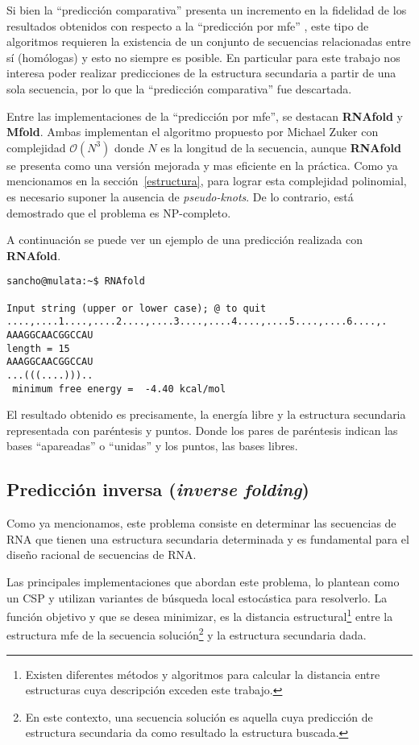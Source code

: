 Si bien la ``predicci\'on comparativa'' presenta un incremento en la fidelidad
de los resultados obtenidos con respecto a la ``predicci\'on por \ac{mfe}''
\cite{Gardner04}, este tipo de algoritmos requieren la existencia de un conjunto
de secuencias relacionadas entre s\'i (hom\'ologas) y esto no siempre es
posible. En particular para este trabajo nos interesa poder realizar
predicciones de la estructura secundaria a partir de una sola secuencia, por lo
que la ``predicci\'on comparativa'' fue descartada.

Entre las implementaciones de la ``predicci\'on por \ac{mfe}'', se destacan
\textbf{RNAfold}\cite{Hofacker94} y \textbf{Mfold}\cite{Zuker81}. Ambas
implementan el algoritmo propuesto por Michael Zuker con complejidad
$\mathcal{O}(N^{3})$ donde $N$ es la longitud de la secuencia, aunque
\textbf{RNAfold} se presenta como una versi\'on mejorada y mas eficiente en la
pr\'actica. Como ya mencionamos en la secci\'on~\ref{estructura}, para lograr
esta complejidad polinomial, es necesario suponer la ausencia de
\textit{pseudo-knots}. De lo contrario, est\'a demostrado que el problema es
NP-completo\cite{Lyngso00}.

A continuaci\'on se puede ver un ejemplo de una predicci\'on realizada con
\textbf{RNAfold}.

\begin{verbatim}
sancho@mulata:~$ RNAfold

Input string (upper or lower case); @ to quit
....,....1....,....2....,....3....,....4....,....5....,....6....,.
AAAGGCAACGGCCAU
length = 15
AAAGGCAACGGCCAU
...(((....)))..
 minimum free energy =  -4.40 kcal/mol
\end{verbatim}

El resultado obtenido es precisamente, la energ\'ia libre y la estructura
secundaria representada con par\'entesis y puntos. Donde los pares de
par\'entesis indican las bases ``apareadas'' o ``unidas'' y los puntos, las
bases libres.

\subsection{Predicci\'on inversa (\textit{inverse folding})}
\label{inverse}
Como ya mencionamos, este problema consiste en determinar las secuencias de
\ac{RNA} que tienen una estructura secundaria determinada y es fundamental
para el dise\~no racional de secuencias de \ac{RNA}.

Las principales implementaciones que abordan este problema, lo plantean como un
\ac{CSP} y utilizan variantes de b\'usqueda local estoc\'astica para
resolverlo. La funci\'on objetivo y que se desea minimizar, es la distancia
estructural\footnote{Existen diferentes m\'etodos y algoritmos para calcular
la distancia entre estructuras cuya descripci\'on exceden este trabajo.}
entre la estructura \ac{mfe} de la secuencia soluci\'on\footnote{En este
contexto, una secuencia soluci\'on es aquella cuya predicci\'on de estructura
secundaria da como resultado la estructura buscada.} y la estructura secundaria
dada. 

